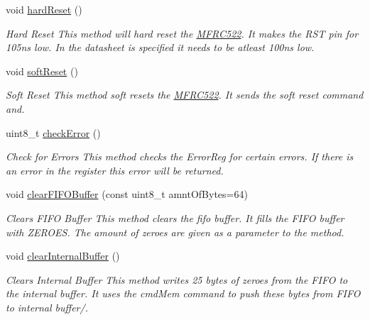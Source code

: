 \begin{DoxyCompactItemize}
\mbox{\label{classMFRC522_a63a76a9e625b23db57612b1d1a832fc1}} 
void \hyperlink{classMFRC522_a63a76a9e625b23db57612b1d1a832fc1}{hard\+Reset} ()
\begin{DoxyCompactList}\small\item\em Hard Reset  This method will hard reset the \hyperlink{classMFRC522}{M\+F\+R\+C522}. It makes the R\+ST pin for 105ns low. In the datasheet is specified it needs to be atleast 100ns low. \end{DoxyCompactList}\item 
\mbox{\label{classMFRC522_acb40bb9c1436570578bccee641b24aec}} 
void \hyperlink{classMFRC522_acb40bb9c1436570578bccee641b24aec}{soft\+Reset} ()
\begin{DoxyCompactList}\small\item\em Soft Reset  This method soft resets the \hyperlink{classMFRC522}{M\+F\+R\+C522}. It sends the soft reset command and. \end{DoxyCompactList}\item 
\mbox{\label{classMFRC522_aa45277248a32ce30e7ded5fd305f2a15}} 
uint8\+\_\+t \hyperlink{classMFRC522_aa45277248a32ce30e7ded5fd305f2a15}{check\+Error} ()
\begin{DoxyCompactList}\small\item\em Check for Errors  This method checks the Error\+Reg for certain errors. If there is an error in the register this error will be returned. \end{DoxyCompactList}\item 
void \hyperlink{classMFRC522_a0a4fb373d6adcfa08c2f274be1a3c0e5}{clear\+F\+I\+F\+O\+Buffer} (const uint8\+\_\+t amnt\+Of\+Bytes=64)
\begin{DoxyCompactList}\small\item\em Clears F\+I\+FO Buffer  This method clears the fifo buffer. It fills the F\+I\+FO buffer with Z\+E\+R\+O\+ES. The amount of zeroes are given as a parameter to the method. \end{DoxyCompactList}\item 
\mbox{\label{classMFRC522_a9d2c5ad7b977944e8bcbbcc9c1bb9b75}} 
void \hyperlink{classMFRC522_a9d2c5ad7b977944e8bcbbcc9c1bb9b75}{clear\+Internal\+Buffer} ()
\begin{DoxyCompactList}\small\item\em Clears Internal Buffer  This method writes 25 bytes of zeroes from the F\+I\+FO to the internal buffer. It uses the cmd\+Mem command to push these bytes from F\+I\+FO to internal buffer/. \end{DoxyCompactList}\item 

\end{DoxyCompactItemize}
